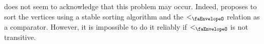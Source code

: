 \cite{reducing_latency_of_dag_based_consensus_in_the_asynchronous_setting_via_the_utxo_model} does not seem to acknowledge that this problem may occur.
Indeed, \cite{reducing_latency_of_dag_based_consensus_in_the_asynchronous_setting_via_the_utxo_model} proposes to sort the vertices using a stable sorting algorithm and the $<_{\text{\faEnvelopeO}}$ relation as a comparator.
However, it is impossible to do it reliably if $<_{\text{\faEnvelopeO}}$ is not transitive.

